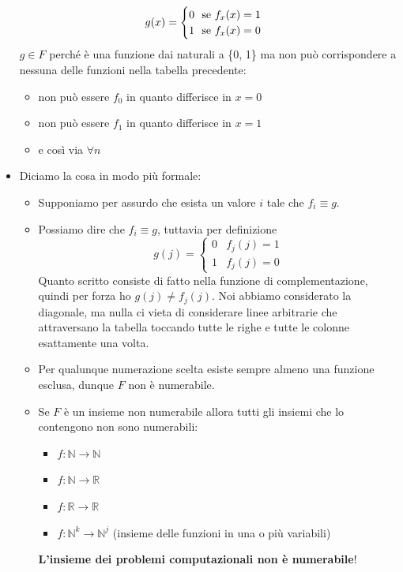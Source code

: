 \begin{itemize}
	\[g(x) = 
	\begin{cases}
		$0 \text{ se }$ f_x(x) = 1 \\
		$1 \text{ se }$ f_x(x) = 0 \\
	\end{cases}\]
	$g \in F$ perché è una funzione dai naturali a \{0, 1\} ma non può corrispondere a nessuna delle funzioni nella tabella precedente:
	\begin{itemize}
		\item non può essere $f_0$ in quanto differisce in $x = 0$
		\item non può essere $f_1$ in quanto differisce in $x = 1$
		\item e così via $\forall n$
	\end{itemize}
	\item Diciamo la cosa in modo più formale:
	\begin{itemize}
		\item Supponiamo per assurdo che esista un valore $i$ tale che $f_i \equiv g$.
		\item Possiamo dire che $f_i\equiv g$, tuttavia per definizione
		\[g(j)=\begin{cases}0&f_j(j)=1\\1&f_j(j)=0\end{cases}\]
		Quanto scritto consiste di fatto nella funzione di complementazione, quindi per forza ho $g\left(j\right)\neq f_j\left(j\right)$. Noi abbiamo considerato la diagonale, ma nulla ci vieta di considerare linee arbitrarie che attraversano la tabella toccando tutte le righe e tutte le colonne esattamente una volta.
		\item Per qualunque numerazione scelta esiste sempre almeno una funzione esclusa, dunque ${F}$ non è numerabile.
		\item Se $F$ è un insieme non numerabile allora tutti gli insiemi che lo contengono non sono numerabili:
		\begin{itemize}
			\item $f:\mathbb{N} \to \mathbb{N}$
			\item $f:\mathbb{N} \to \mathbb{R}$
			\item $f:\mathbb{R} \to \mathbb{R}$
			\item $f:\mathbb{N}^k\to \mathbb{N}^j$ (insieme delle funzioni in una o più variabili)
		\end{itemize}
		\textbf{L'insieme dei problemi computazionali non è numerabile}!
	\end{itemize}
\end{itemize}

